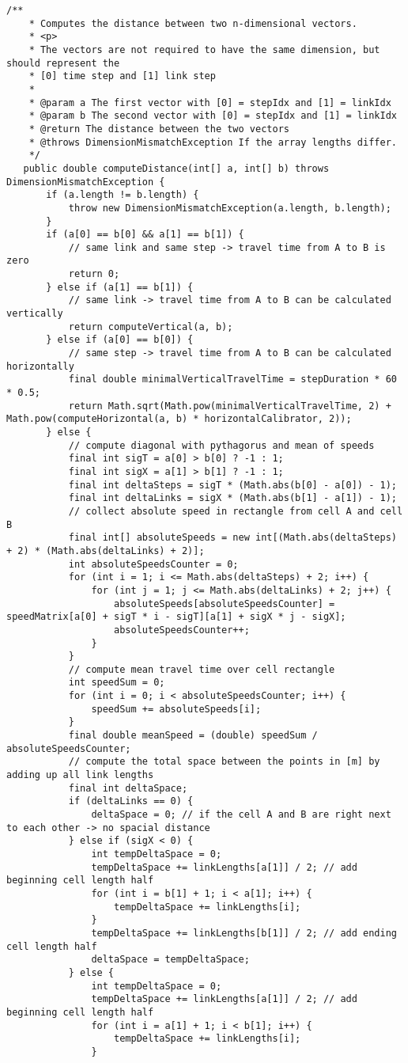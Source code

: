 \begin{lstlisting}[basicstyle=\tiny, style=java, caption={diagonal distance calculation}, label=lst:distance_calc_diagonal] 
	/**
	* Computes the distance between two n-dimensional vectors.
	* <p>
	* The vectors are not required to have the same dimension, but should represent the
	* [0] time step and [1] link step
	*
	* @param a The first vector with [0] = stepIdx and [1] = linkIdx
	* @param b The second vector with [0] = stepIdx and [1] = linkIdx
	* @return The distance between the two vectors
	* @throws DimensionMismatchException If the array lengths differ.
	*/
   public double computeDistance(int[] a, int[] b) throws DimensionMismatchException {
	   if (a.length != b.length) {
		   throw new DimensionMismatchException(a.length, b.length);
	   }
	   if (a[0] == b[0] && a[1] == b[1]) {
		   // same link and same step -> travel time from A to B is zero
		   return 0;
	   } else if (a[1] == b[1]) {
		   // same link -> travel time from A to B can be calculated vertically
		   return computeVertical(a, b);
	   } else if (a[0] == b[0]) {
		   // same step -> travel time from A to B can be calculated horizontally
		   final double minimalVerticalTravelTime = stepDuration * 60 * 0.5;
		   return Math.sqrt(Math.pow(minimalVerticalTravelTime, 2) + Math.pow(computeHorizontal(a, b) * horizontalCalibrator, 2));
	   } else {
		   // compute diagonal with pythagorus and mean of speeds
		   final int sigT = a[0] > b[0] ? -1 : 1;
		   final int sigX = a[1] > b[1] ? -1 : 1;
		   final int deltaSteps = sigT * (Math.abs(b[0] - a[0]) - 1);
		   final int deltaLinks = sigX * (Math.abs(b[1] - a[1]) - 1);
		   // collect absolute speed in rectangle from cell A and cell B
		   final int[] absoluteSpeeds = new int[(Math.abs(deltaSteps) + 2) * (Math.abs(deltaLinks) + 2)];
		   int absoluteSpeedsCounter = 0;
		   for (int i = 1; i <= Math.abs(deltaSteps) + 2; i++) {
			   for (int j = 1; j <= Math.abs(deltaLinks) + 2; j++) {
				   absoluteSpeeds[absoluteSpeedsCounter] = speedMatrix[a[0] + sigT * i - sigT][a[1] + sigX * j - sigX];
				   absoluteSpeedsCounter++;
			   }
		   }
		   // compute mean travel time over cell rectangle
		   int speedSum = 0;
		   for (int i = 0; i < absoluteSpeedsCounter; i++) {
			   speedSum += absoluteSpeeds[i];
		   }
		   final double meanSpeed = (double) speedSum / absoluteSpeedsCounter;
		   // compute the total space between the points in [m] by adding up all link lengths
		   final int deltaSpace;
		   if (deltaLinks == 0) {
			   deltaSpace = 0; // if the cell A and B are right next to each other -> no spacial distance
		   } else if (sigX < 0) {
			   int tempDeltaSpace = 0;
			   tempDeltaSpace += linkLengths[a[1]] / 2; // add beginning cell length half
			   for (int i = b[1] + 1; i < a[1]; i++) {
				   tempDeltaSpace += linkLengths[i];
			   }
			   tempDeltaSpace += linkLengths[b[1]] / 2; // add ending cell length half
			   deltaSpace = tempDeltaSpace;
		   } else {
			   int tempDeltaSpace = 0;
			   tempDeltaSpace += linkLengths[a[1]] / 2; // add beginning cell length half
			   for (int i = a[1] + 1; i < b[1]; i++) {
				   tempDeltaSpace += linkLengths[i];
			   }


\end{lstlisting}
